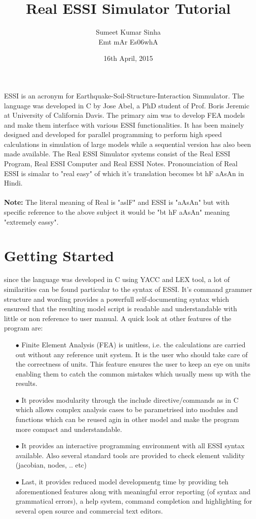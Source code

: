 \documentclass{article}
\title{Real ESSI Simulator Tutorial}
\author{Sumeet Kumar Sinha \\ {\dn \7{s}Emt \7{k}mAr Es\306whA }  }
\date{16th April, 2015}
\begin{document}
\maketitle
ESSI is an acronym for Earthquake-Soil-Structure-Interaction Simmulator. The language was developed in C by Jose Abel, a PhD student of Prof. Boris Jeremic at University of California Davis. The primary aim was to develop FEA models and make them interface with various ESSI functionalities. It has been mainely designed and developed for parallel programming to perform high speed calculations in simulation of large models while a sequential version has also been made available. The Real ESSI Simulator systems consist of the Real ESSI Program, Real ESSI Computer and Real ESSI Notes. Pronounciation of Real ESSI is simalar to "real easy" of which it's translation becomes {\dn bt hF aAsAn} in Hindi. 
\\
\\
\textbf{Note:} The literal meaning of Real is "{\dn aslF}" and ESSI is "{\dn aAsAn}" but with specific reference to the above subject it would be "{\dn bt hF aAsAn}" meaning "extremely eassy".

\section {Getting Started} 
since the language was developed in C using YACC and LEX tool, a lot of similarities can be found particular to the syntax of ESSI. It's command grammer structure and wording provides a powerfull self-documenting syntax which ensuresd that the resulting model script is readable and understandable with little or non reference to user manual. A quick look at other features of the program are:

\begin{itemize}
  \item[$\bullet$] Finite Element Analysis (FEA) is unitless, i.e. the calculations are carried out without any reference unit system. It is the user who should take care of the correctness of units. This feature ensures the user to keep an eye on units enabling them to catch the common mistakes which usually mess up with the results.  
  \item[$\bullet$] It provides modularity through the include directive/commands as in C which allows complex analysis cases to be parametrised into modules and functions which can be reused agin in other model and make the program more compact and understandable.
  \item[$\bullet$] It provides an interactive programming environment with all ESSI syntax available. Also several standard tools are provided to check element validity (jacobian, nodes, .. etc)
  \item[$\bullet$] Last, it provides reduced model developmentg time by providing teh aforementioned features along with meaningful error reporting (of syntax and grammatical errors), a help system, command completion and highlighting for several open source and commercial text editors.
\end {itemize}
\end{document}
